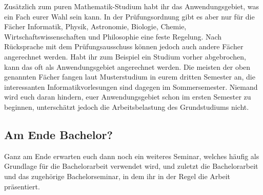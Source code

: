Zusätzlich zum puren Mathematik-Studium habt ihr das Anwendungsgebiet, was ein Fach eurer Wahl sein kann. In der Prüfungsordnung gibt es aber nur für die Fächer Informatik, Physik, Astronomie, Biologie, Chemie, Wirtschaftswissenschaften und Philosophie eine feste Regelung. Nach Rücksprache mit dem Prüfungsausschuss können jedoch auch andere Fächer angerechnet werden. Habt ihr zum Beispiel ein Studium vorher abgebrochen, kann das oft als Anwendungsgebiet angerechnet werden. Die meisten der oben genannten Fächer fangen laut Musterstudium in eurem dritten Semester an, die interessanten Informatikvorlesungen sind dagegen im Sommersemester. Niemand wird euch daran hindern, euer Anwendungsgebiet schon im ersten Semester zu beginnen, unterschätzt jedoch die Arbeitsbelastung des Grundstudiums nicht.

\subsection{Am Ende Bachelor?}

Ganz am Ende erwarten euch dann noch ein weiteres Seminar, welches häufig als Grundlage für die Bachelorarbeit verwendet wird, und zuletzt die Bachelorarbeit und das zugehörige Bachelorseminar, in dem ihr in der Regel die Arbeit präsentiert.
